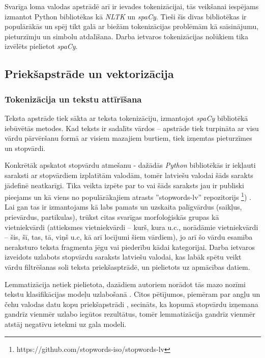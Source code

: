 Svarīga loma valodas apstrādē arī ir ievades tokenizācijai, tās veikšanai iespējams izmantot Python bibliotēkas kā \textit{NLTK} un \textit{spaCy}. Tieši šīs divas bibliotēkas ir populārākās un spēj tikt galā ar biežām tokenizācijas problēmām kā saīsinājumu, pieturzīmju un simbolu atdalīšana. Darba ietvaros tokenizācijas nolūkiem tika izvēlēts pielietot \textit{spaCy}.

\subsection{Priekšapstrāde un vektorizācija}
\subsubsection{Tokenizācija un tekstu attīrīšana}
Teksta apstrāde tiek sākta ar teksta tokenizāciju, izmantojot \textit{spaCy} bibliotēkā iebūvētās metodes. Kad teksts ir sadalīts vārdos – apstrāde tiek turpināta ar visu vārdu pārvēršanu formā ar visiem mazajiem burtiem, tiek izņemtas pieturzīmes un stopvārdi.

Konkrētāk apskatot stopvārdu atmešanu - dažādās \textit{Python} bibliotēkās ir iekļauti saraksti ar stopvārdiem izplatītām valodām, tomēr latviešu valodai šāds sarakts jādefinē neatkarīgi. Tika veikta izpēte par to vai šāds saraksts jau ir publiski pieejams un kā viens no populārākajiem atrasts ''stopwords-lv'' repozitorijs \footnote{https://github.com/stopwords-iso/stopwords-lv}) . Lai gan tas ir izmantojams kā labs pamats un uzskaita palīgvārdus (saikļus, prievārdus, partikulas), trūkst citas svarīgas morfoloģiskās grupas kā vietniekvārdi (attieksmes vietniekvārdi – kurš, kura u.c., norādāmie vietniekvārdi – šis, šī, tas, tā, viņš u.c, kā arī locījumi šiem vārdiem), jo arī šo vārdu esamība neraksturo teksta fragmenta jēgu vai piederību kādai kategorijai. Darba ietvaros izveidots uzlabots stopvārdu saraksts latviešu valodai, kas labāk spētu veikt vārdu filtrēšanas soli teksta priekšasptrādē, un pielietots uz apmācības datiem. 

Lemmatizācija netiek pielietota, dazādiem autoriem norādot tās mazo nozīmi tekstu klasifikācijas modeļu uzlabošanā \cite{santos2023effect}. Citos pētījumos, piemēram par angļu un čehu valodas datu kopu priekšapstrādi \cite{normalizationTextClassification}, secināts, ka kopumā stopvārdu izņemana gandrīz vienmēr uzlabo iegūtos rezultātus, tomēr lemmatizācija gandrīz vienmēr atstāj negatīvu ietekmi uz gala modeli.

